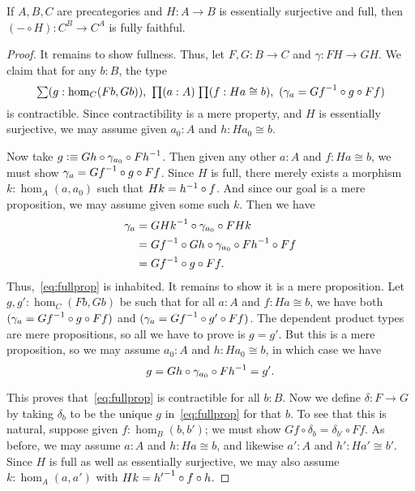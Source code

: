 \begin{lem}
  If $A,B,C$ are precategories and $H:A\to B$ is essentially surjective and full, then $(-\circ H):C^B \to C^A$ is fully faithful.
\end{lem}
\begin{proof}
  It remains to show fullness.
  Thus, let $F,G:B\to C$ and $\gamma:FH \to GH$.
  We claim that for any $b:B$, the type
  \begin{equation}\label{eq:fullprop}
    \sm{g:\hom_C(Fb,Gb)} \prd{a:A}{f:Ha\cong b} (\gamma_a =  \inv{Gf}\circ g\circ Ff)
  \end{equation}
  is contractible.
  Since contractibility is a mere property, and $H$ is essentially surjective, we may assume given $a_0:A$ and $h:Ha_0\cong b$.

  Now take $g\vcentcolon\equiv Gh \circ \gamma_{a_0} \circ {Fh}^{-1}$.
  Then given any other $a:A$ and $f:Ha\cong b$, we must show $\gamma_a =  {Gf}^{-1}\circ g\circ Ff$.
  Since $H$ is full, there merely exists a morphism $k:\hom_A(a,a_0)$ such that $Hk = {h}^{-1}\circ f$.
  And since our goal is a mere proposition, we may assume given some such $k$.
  Then we have
  \begin{align*}
    \gamma_a &= {GHk}^{-1}\circ \gamma_{a_0} \circ FHk\\
    &= {Gf}^{-1} \circ Gh \circ \gamma_{a_0} \circ {Fh}^{-1} \circ Ff\\
    &= {Gf}^{-1}\circ g\circ Ff.
  \end{align*}
  Thus,~\eqref{eq:fullprop} is inhabited.
  It remains to show it is a mere proposition.
  Let $g,g':\hom_C(Fb, Gb)$ be such that for all $a:A$ and $f:Ha\cong b$, we have both $(\gamma_a =  {Gf}^{-1}\circ g\circ Ff)$ and $(\gamma_a =  {Gf}^{-1}\circ g'\circ Ff)$.
  The dependent product types are mere propositions, so all we have to prove is $g=g'$.
  But this is a mere proposition, so we may assume $a_0:A$ and $h:Ha_0\cong b$, in which case we have
  \[ g = Gh \circ \gamma_{a_0} \circ {Fh}^{-1} = g'.\]

  This proves that~\eqref{eq:fullprop} is contractible for all $b:B$.
  Now we define $\delta:F\to G$ by taking $\delta_b$ to be the unique $g$ in~\eqref{eq:fullprop} for that $b$.
  To see that this is natural, suppose given $f:\hom_B(b,b')$; we must show $Gf \circ \delta_b = \delta_{b'}\circ Ff$.
  As before, we may assume $a:A$ and $h:Ha\cong b$, and likewise $a':A$ and $h':Ha'\cong b'$.
  Since $H$ is full as well as essentially surjective, we may also assume $k:\hom_A(a,a')$ with $Hk = {h'}^{-1}\circ f\circ h$.


\end{proof}
